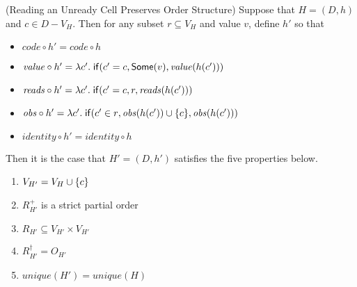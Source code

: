 \begin{lemma}{(Reading an Unready Cell Preserves Order Structure)}
Suppose that $H = (D,h)$ and $c \in D - V_H$. Then for any subset $r
\subseteq V_H$ and value $v$, define $h'$ so that
\begin{itemize}
\item $\mathit{code} \circ h' = \mathit{code} \circ h$ 
\item $\mathit{value} \circ h' = \lambda c'.\;\mathsf{if}({c' = c}, {\mathsf{Some}(v)}, {\mathit{value}(h(c'))})$ 
\item $\mathit{reads} \circ h' = \lambda c'.\;\mathsf{if}({c' = c}, {r}, {\mathit{reads}(h(c'))})$ 
\item $\mathit{obs} \circ h' = \lambda c'.\;\mathsf{if}({c' \in r}, {\mathit{obs}(h(c')) \cup \{{c}\}}, {\mathit{obs}(h(c'))})$ 
\item $\mathit{identity} \circ h' = \mathit{identity} \circ h$
\end{itemize}
\noindent Then it is the case that $H' = (D,h')$ satisfies the five properties below. 
\begin{enumerate}
\item $V_{H'} = V_H \cup \{{c}\}$
\item $R^+_{H'}$ is a strict partial order 
\item $R_{H'} \subseteq V_{H'} \times V_{H'}$
\item $R^\dagger_{H'} = O_{H'}$ 
\item $\mathit{unique}(H') = \mathit{unique}(H)$
\end{enumerate}
\end{lemma}

